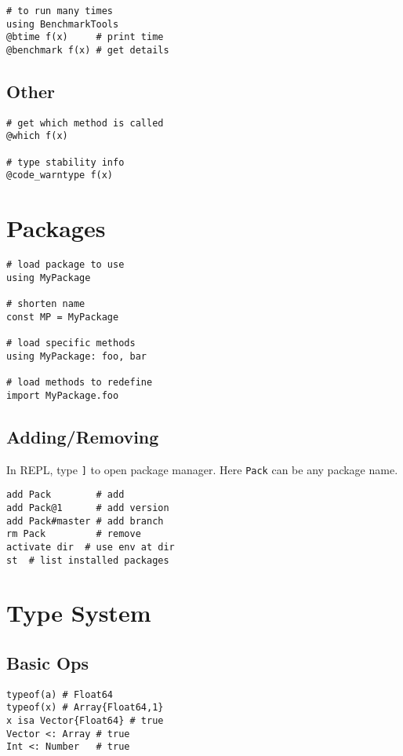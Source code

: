\documentclass{article}
\begin{document}
\begin{multicols*}{3}
\begin{verbatim}
# to run many times
using BenchmarkTools
@btime f(x)     # print time
@benchmark f(x) # get details
\end{verbatim}

\subsection{Other}
\vspace*{-2mm}
\begin{verbatim}
# get which method is called
@which f(x)

# type stability info
@code_warntype f(x)
\end{verbatim}

\section{Packages}
\vspace*{-2mm}
\begin{verbatim}
# load package to use
using MyPackage 

# shorten name
const MP = MyPackage

# load specific methods
using MyPackage: foo, bar 

# load methods to redefine 
import MyPackage.foo
\end{verbatim}

\subsection{Adding/Removing}
In REPL, type \texttt{]} to open 
package manager. Here \texttt{Pack}
can be any package name.
\begin{verbatim}
add Pack        # add
add Pack@1      # add version
add Pack#master # add branch
rm Pack         # remove
activate dir  # use env at dir
st  # list installed packages
\end{verbatim}

\section{Type System}
\subsection{Basic Ops}
\vspace*{-2mm}
\begin{verbatim}
typeof(a) # Float64
typeof(x) # Array{Float64,1}
x isa Vector{Float64} # true
Vector <: Array # true 
Int <: Number   # true
\end{verbatim}


\end{multicols*}
\end{document}
